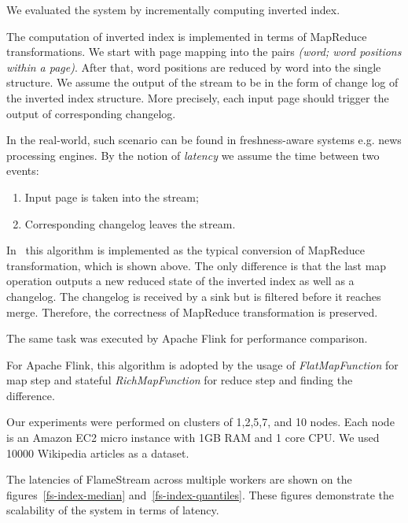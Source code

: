 
\label{fs-experiments-section}

We evaluated the system by incrementally computing inverted index.

The computation of inverted index is implemented in terms of MapReduce transformations. We start with page mapping into the pairs {\it (word; word positions within a page)}. After that, word positions are reduced by word into the single structure. We assume the output of the stream to be in the form of change log of the inverted index structure. More precisely, each input page should trigger the output of corresponding changelog. 

In the real-world, such scenario can be found in freshness-aware systems e.g. news processing engines. By the notion of {\it latency} we assume the time between two events: 
\begin{enumerate}
    \item Input page is taken into the stream;
    \item Corresponding changelog leaves the stream.
\end{enumerate}

In \FlameStream\ this algorithm is implemented as the typical conversion of MapReduce transformation, which is shown above. The only difference is that the last map operation outputs a new reduced state of the inverted index as well as a changelog. The changelog is received by a sink but is filtered before it reaches merge. Therefore, the correctness of MapReduce transformation is preserved.

The same task was executed by Apache Flink for performance comparison.

For Apache Flink, this algorithm is adopted by the usage of {\it FlatMapFunction} for map step and stateful {\it RichMapFunction} for reduce step and finding the difference.

Our experiments were performed on clusters of 1,2,5,7, and 10 nodes. Each node is an Amazon EC2 micro instance with 1GB RAM and 1 core CPU. We used 10000 Wikipedia articles as a dataset. 

The latencies of FlameStream across multiple workers are shown on the figures~\ref{fs-index-median} and~\ref{fs-index-quantiles}. These figures demonstrate the scalability of the system in terms of latency.

